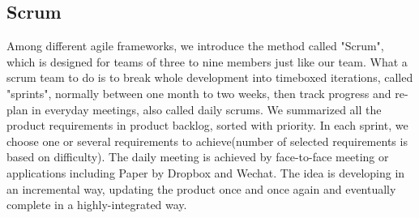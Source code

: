 \documentclass[a4paper,11pt]{article}
\begin{document}
\subsection{Scrum}
Among different agile frameworks, we introduce the method called "Scrum", which is designed for teams of three to nine members just like our team. What a scrum team to do is to break whole development into timeboxed iterations, called "sprints", normally between one month to two weeks, then track progress and re-plan in everyday meetings, also called daily scrums. 
We summarized all the product requirements in product backlog, sorted with priority. In each sprint, we choose one or several requirements to achieve(number of selected requirements is based on difficulty). The daily meeting is achieved by face-to-face meeting or applications including Paper by Dropbox and Wechat.
The idea is developing in an incremental way, updating the product once and once again and eventually complete in a highly-integrated way.
\end{document}
